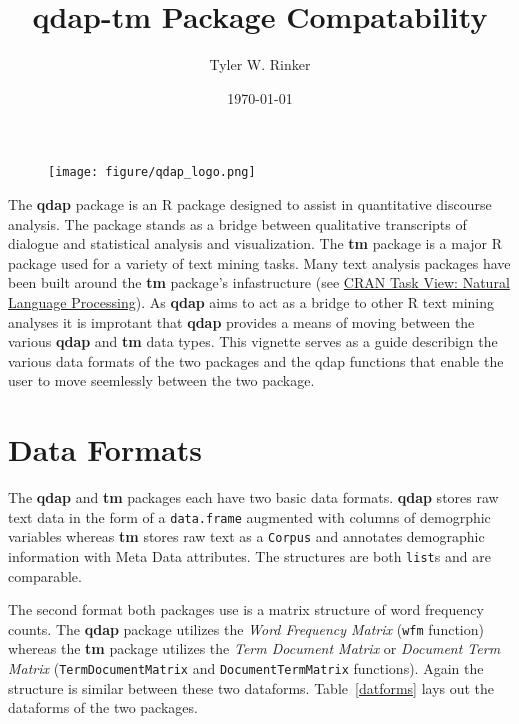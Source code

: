 \documentclass{article}\usepackage[]{graphicx}\usepackage[]{color}
\begin{document}
\title{qdap-tm Package Compatability}
\author{Tyler W. Rinker}
\date{\today}
\maketitle

\vspace{1cm}
\begin{figure}[h!]
  \centering
    \texttt{[image: figure/qdap\_logo.png]}
\end{figure}

The \textbf{qdap} package \citep{R-qdap} is an R package designed to assist in quantitative discourse analysis. The package stands as a bridge between qualitative transcripts of dialogue and statistical analysis and visualization.  The \textbf{tm} package \citep{R-tm} is a major R \citep{R-core} package used for a variety of text mining tasks. Many text analysis packages have been built around the \textbf{tm} package's infastructure (see \href{http://cran.r-project.org/web/views/NaturalLanguageProcessing.html}{CRAN Task View: Natural Language Processing}).  As \textbf{qdap} aims to act as a bridge to other R text mining analyses it is improtant that \textbf{qdap} provides a means of moving between the various \textbf{qdap} and \textbf{tm} data types.  This vignette serves as a guide describign the various data formats of the two packages and the qdap functions that enable the user to move seemlessly between the two package.




\newpage
\section{Data Formats}

\hspace{.4cm} The \textbf{qdap} and \textbf{tm} packages each have two basic data formats.  \textbf{qdap} stores raw text data in the form of a \texttt{data.frame} augmented with columns of demogrphic variables whereas \textbf{tm} stores raw text as a \texttt{Corpus} and annotates demographic information with Meta Data attributes.  The structures are both \texttt{list}s and are comparable.

The second format both packages use is a matrix structure of word frequency counts.  The \textbf{qdap} package utilizes the \emph{Word Frequency Matrix} (\texttt{wfm} function) whereas the \textbf{tm} package utilizes the \emph{Term Document Matrix} or \emph{Document Term Matrix} (\texttt{TermDocumentMatrix} and \texttt{DocumentTermMatrix} functions).  Again the structure is similar between these two dataforms.  Table~\ref{datforms} lays out the dataforms of the two packages.
\end{document}
